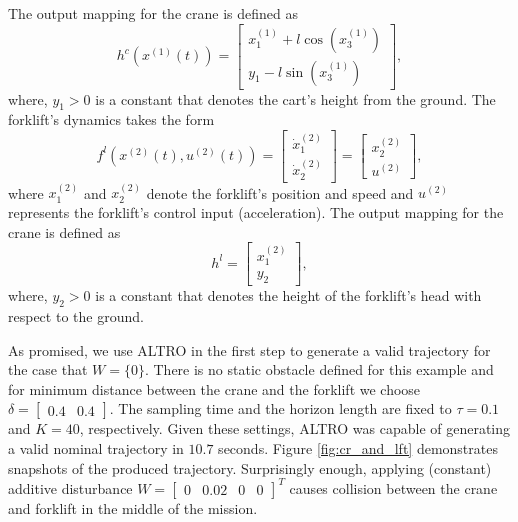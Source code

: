 The output mapping for the crane is defined as
\[
h^c(x^{(1)}(t))=\begin{bmatrix}
	x_1^{(1)}+l \cos(x_3^{(1)})\\
	y_1-l \sin(x_3^{(1)})
\end{bmatrix},
\]
where, $y_1>0$ is a constant that denotes the cart's height from the ground.
The forklift's dynamics takes the form
\[f^{l}(x^{(2)}(t),u^{(2)}(t))=\begin{bmatrix}
\dot{x}_1^{(2)}\\ \dot{x}^{(2)}_2 \end{bmatrix}=\begin{bmatrix} x^{(2)}_2\\ u^{(2)} \end{bmatrix},
\]
where $x_1^{(2)}$ and $x_2^{(2)}$ denote the forklift's position and speed and $u^{(2)}$ represents the forklift's control input (acceleration). The output mapping for the crane is defined as
\[
h^l=\begin{bmatrix}
	x_1^{(2)}\\
	y_2
\end{bmatrix},
\]
where, $y_2>0$ is a constant that denotes the height of the forklift's head with respect to the ground.

As promised, we use ALTRO in the first step to generate a valid trajectory for the case that $W=\{0\}$. There is no static obstacle defined for this example and for minimum distance between the crane and the forklift we choose $\delta=\begin{bmatrix}0.4&0.4\end{bmatrix}$. The sampling time and the horizon length are fixed to $\tau=0.1$ and $K=40$, respectively. Given these settings, ALTRO was capable of generating a valid nominal trajectory in $10.7$ seconds. Figure \ref{fig:cr_and_lft} demonstrates snapshots of the produced trajectory. Surprisingly enough, applying (constant) additive disturbance $W=\begin{bmatrix}0&0.02&0&0\end{bmatrix}^T$ causes collision between the crane and forklift in the middle of the mission.

